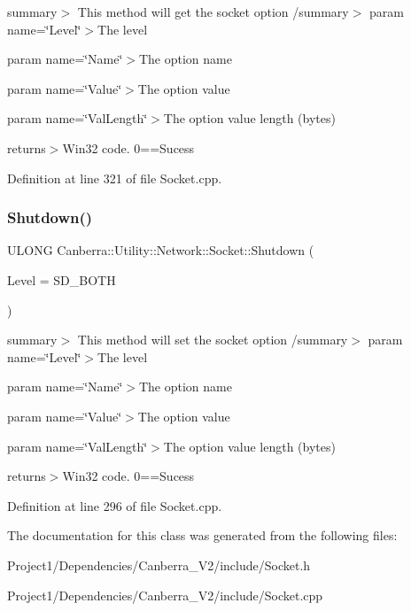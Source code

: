 summary$>$ This method will get the socket option /summary$>$ param name=\char`\"{}\+Level\char`\"{}$>$The level

param name=\char`\"{}\+Name\char`\"{}$>$The option name

param name=\char`\"{}\+Value\char`\"{}$>$The option value

param name=\char`\"{}\+Val\+Length\char`\"{}$>$The option value length (bytes)

returns$>$Win32 code. 0==Sucess

Definition at line 321 of file Socket.\+cpp.

\mbox{\label{class_canberra_1_1_utility_1_1_network_1_1_socket_a95bcbcc02a2a066c7060d32aa0db24ff_a95bcbcc02a2a066c7060d32aa0db24ff}} 
\subsubsection{\texorpdfstring{Shutdown()}{Shutdown()}}
{\footnotesize\ttfamily U\+L\+O\+NG Canberra\+::\+Utility\+::\+Network\+::\+Socket\+::\+Shutdown (\begin{DoxyParamCaption}\item[{L\+O\+NG}]{Level = {\ttfamily SD\+\_\+BOTH} }\end{DoxyParamCaption})}

summary$>$ This method will set the socket option /summary$>$ param name=\char`\"{}\+Level\char`\"{}$>$The level

param name=\char`\"{}\+Name\char`\"{}$>$The option name

param name=\char`\"{}\+Value\char`\"{}$>$The option value

param name=\char`\"{}\+Val\+Length\char`\"{}$>$The option value length (bytes)

returns$>$Win32 code. 0==Sucess

Definition at line 296 of file Socket.\+cpp.



The documentation for this class was generated from the following files\+:\begin{DoxyCompactItemize}
\item 
Project1/\+Dependencies/\+Canberra\+\_\+\+V2/include/Socket.\+h\item 
Project1/\+Dependencies/\+Canberra\+\_\+\+V2/include/Socket.\+cpp\end{DoxyCompactItemize}
